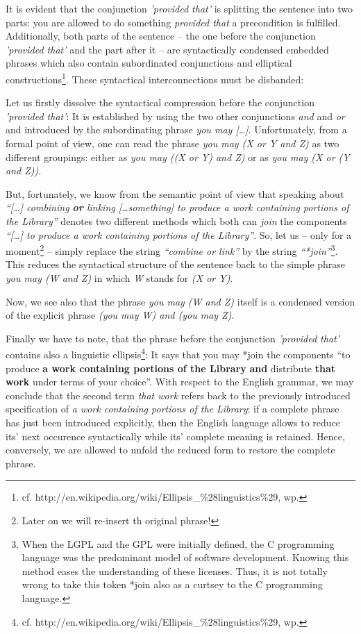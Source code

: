 It is evident that the conjunction \emph{'provided that'} is splitting the
sentence into two parts: you are allowed to do something \emph{provided that} a
precondition is fulfilled. Additionally, both parts of the sentence --
the one before the conjunction \emph{'provided that'} and the part after it --
are syntactically condensed embedded phrases which also contain subordinated 
conjunctions and elliptical constructions\footnote{cf.
http://en.wikipedia.org/wiki/Ellipsis\_\%28linguistics\%29, wp.
}. These syntactical interconnections must be disbanded:

Let us firstly dissolve the syntactical compression before the conjunction
\emph{'provided that'}: It is established by using the two other conjunctions
\emph{and} and \emph{or} and introduced by the subordinating phrase \emph{you
may [\ldots]}. Unfortunately, from a formal point of view, one can read the
phrase \emph{you may (X or Y and Z)} as two different groupings: either as \emph{you
may ((X or Y) and Z)} or as \emph{you may (X or (Y and Z))}.

But, fortunately, we know from the semantic point of view that speaking about
\emph{\enquote{[\ldots] combining \textbf{or} linking [\ldots something] to
produce a work containing portions of the Library}} denotes two different
methods which both can \emph{join} the components \emph{\enquote{[\ldots] to
produce a work containing portions of the Library}}. So, let us -- only for a
moment\footnote{Later on we will re-insert th original phrase!} -- simply
replace the string \emph{\enquote{combine or link}} by the string
\emph{\enquote{*join}}\footnote{When the LGPL and the GPL were initially
defined, the C programming language was the predominant model of software
development. Knowing this method eases the understanding of these licenses.
Thus, it is not totally wrong to take this token *join also as a curtsey to the
C programming language.}. This reduces the syntactical structure of the sentence
back to the simple phrase \emph{you may (W and Z)} in which \emph{W} stands for
\emph{(X or Y)}.

Now, we see also that the phrase \emph{you may (W and Z)} itself is a
condensed version of the explicit phrase \emph{ (you may W) and (you may Z)}.

Finally we have to note, that the phrase before the conjunction \emph{'provided
that'} contains also a linguistic ellipsis\footnote{cf.
http://en.wikipedia.org/wiki/Ellipsis\_\%28linguistics\%29, wp.
}: It says that you may *join the components \enquote{to produce \textbf{a work
containing portions of the Library} \textbf{and} distribute \textbf{that work}
under terms of your choice}. With respect to the English grammar, we may
conclude that the second term \emph{that work} refers back to the previously
introduced specification of \emph{a work containing portions of the Library}: if
a complete phrase has just been introduced explicitly, then the English language
allows to reduce its' next occurence syntactically while its' complete meaning
is retained. Hence, conversely, we are allowed to unfold the reduced form to
restore the complete phrase.

